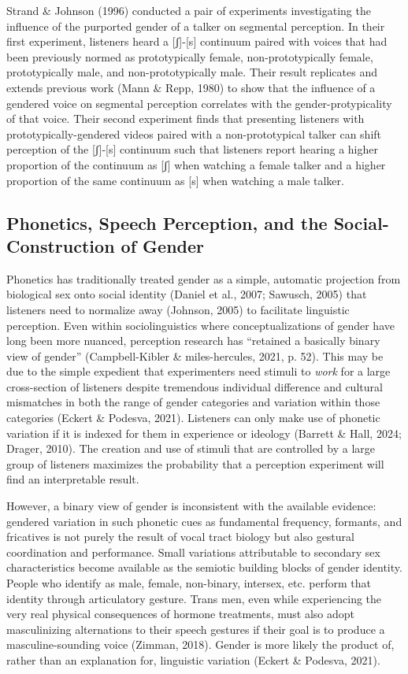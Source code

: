 \documentclass[
  letterpaper,
  DIV=11,
  numbers=noendperiod]{scrartcl}
\begin{document}
Strand \& Johnson (1996) conducted a pair of experiments investigating
the influence of the purported gender of a talker on segmental
perception. In their first experiment, listeners heard a {[}ʃ{]}-{[}s{]}
continuum paired with voices that had been previously normed as
prototypically female, non-prototypically female, prototypically male,
and non-prototypically male. Their result replicates and extends
previous work (Mann \& Repp, 1980) to show that the influence of a
gendered voice on segmental perception correlates with the
gender-protypicality of that voice. Their second experiment finds that
presenting listeners with prototypically-gendered videos paired with a
non-prototypical talker can shift perception of the {[}ʃ{]}-{[}s{]}
continuum such that listeners report hearing a higher proportion of the
continuum as {[}ʃ{]} when watching a female talker and a higher
proportion of the same continuum as {[}s{]} when watching a male talker.

\subsection{Phonetics, Speech Perception, and the Social-Construction of
Gender}\label{sec-gender}

Phonetics has traditionally treated gender as a simple, automatic
projection from biological sex onto social identity (Daniel et al.,
2007; Sawusch, 2005) that listeners need to normalize away (Johnson,
2005) to facilitate linguistic perception. Even within sociolinguistics
where conceptualizations of gender have long been more nuanced,
perception research has ``retained a basically binary view of gender''
(Campbell-Kibler \& miles-hercules, 2021, p. 52). This may be due to the
simple expedient that experimenters need stimuli to \emph{work} for a
large cross-section of listeners despite tremendous individual
difference and cultural mismatches in both the range of gender
categories and variation within those categories (Eckert \& Podesva,
2021). Listeners can only make use of phonetic variation if it is
indexed for them in experience or ideology (Barrett \& Hall, 2024;
Drager, 2010). The creation and use of stimuli that are controlled by a
large group of listeners maximizes the probability that a perception
experiment will find an interpretable result.

However, a binary view of gender is inconsistent with the available
evidence: gendered variation in such phonetic cues as fundamental
frequency, formants, and fricatives is not purely the result of vocal
tract biology but also gestural coordination and performance. Small
variations attributable to secondary sex characteristics become
available as the semiotic building blocks of gender identity. People who
identify as male, female, non-binary, intersex, etc. perform that
identity through articulatory gesture. Trans men, even while
experiencing the very real physical consequences of hormone treatments,
must also adopt masculinizing alternations to their speech gestures if
their goal is to produce a masculine-sounding voice (Zimman, 2018).
Gender is more likely the product of, rather than an explanation for,
linguistic variation (Eckert \& Podesva, 2021).
\end{document}

